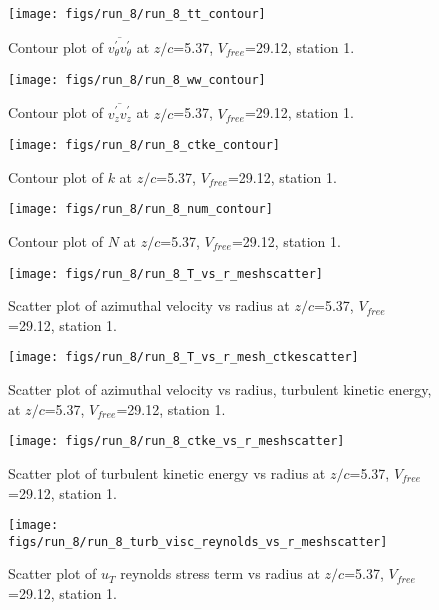 \begin{figure}[H]
\centering
\texttt{[image: figs/run\_8/run\_8\_tt\_contour]}
\caption{Contour plot of $\overline{v_{\theta}^{\prime} v_{\theta}^{\prime}}$ at $z/c$=5.37, $V_{free}$=29.12, station 1.}
\end{figure}


\begin{figure}[H]
\centering
\texttt{[image: figs/run\_8/run\_8\_ww\_contour]}
\caption{Contour plot of $\overline{v_{z}^{\prime} v_{z}^{\prime}}$ at $z/c$=5.37, $V_{free}$=29.12, station 1.}
\end{figure}


\begin{figure}[H]
\centering
\texttt{[image: figs/run\_8/run\_8\_ctke\_contour]}
\caption{Contour plot of $k$ at $z/c$=5.37, $V_{free}$=29.12, station 1.}
\end{figure}


\begin{figure}[H]
\centering
\texttt{[image: figs/run\_8/run\_8\_num\_contour]}
\caption{Contour plot of $N$ at $z/c$=5.37, $V_{free}$=29.12, station 1.}
\end{figure}


\begin{figure}[H]
\centering
\texttt{[image: figs/run\_8/run\_8\_T\_vs\_r\_meshscatter]}
\caption{Scatter plot of azimuthal velocity vs radius at $z/c$=5.37, $V_{free}$=29.12, station 1.}
\end{figure}


\begin{figure}[H]
\centering
\texttt{[image: figs/run\_8/run\_8\_T\_vs\_r\_mesh\_ctkescatter]}
\caption{Scatter plot of azimuthal velocity vs radius, turbulent kinetic energy, at $z/c$=5.37, $V_{free}$=29.12, station 1.}
\end{figure}


\begin{figure}[H]
\centering
\texttt{[image: figs/run\_8/run\_8\_ctke\_vs\_r\_meshscatter]}
\caption{Scatter plot of turbulent kinetic energy vs radius at $z/c$=5.37, $V_{free}$=29.12, station 1.}
\end{figure}


\begin{figure}[H]
\centering
\texttt{[image: figs/run\_8/run\_8\_turb\_visc\_reynolds\_vs\_r\_meshscatter]}
\caption{Scatter plot of $
u_T$ reynolds stress term vs radius at $z/c$=5.37, $V_{free}$=29.12, station 1.}
\end{figure}


